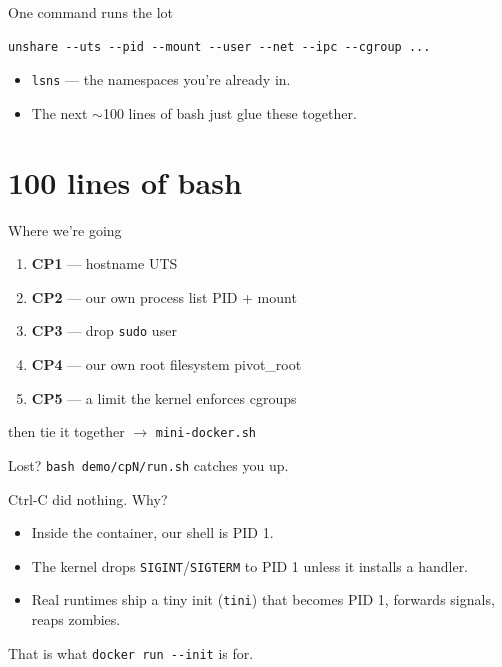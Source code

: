 \documentclass[10pt,aspectratio=169]{beamer}
\newcommand{\cmd}[1]{\texttt{\small #1}}
\begin{document}
\begin{frame}[fragile]{One command runs the lot}
  \begin{lstlisting}
unshare --uts --pid --mount --user --net --ipc --cgroup ...
  \end{lstlisting}
  \begin{itemize}
    \item \cmd{lsns} — the namespaces you're already in.
    \item The next \alert{$\sim$100 lines of bash} just glue these together.
  \end{itemize}
\end{frame}

\section{100 lines of bash}

\begin{frame}{Where we're going}
  \begin{enumerate}
    \item \textbf{CP1} — hostname \hfill {\small UTS}
    \item \textbf{CP2} — our own process list \hfill {\small PID + mount}
    \item \textbf{CP3} — drop \cmd{sudo} \hfill {\small user}
    \item \textbf{CP4} — our own root filesystem \hfill {\small pivot\_root}
    \item \textbf{CP5} — a limit the kernel enforces \hfill {\small cgroups}
  \end{enumerate}
  \vspace{1em}
  \begin{center}
    \small then tie it together $\rightarrow$ \cmd{mini-docker.sh}
  \end{center}
  \vfill
  {\footnotesize Lost? \cmd{bash demo/cpN/run.sh} catches you up.}
\end{frame}

\begin{frame}{Ctrl-C did nothing. Why?}
  \begin{itemize}
    \item Inside the container, our shell is \alert{PID 1}.
    \item The kernel \alert{drops} \cmd{SIGINT}/\cmd{SIGTERM} to PID 1 unless it
          installs a handler.
    \item Real runtimes ship a tiny init (\cmd{tini}) that becomes PID 1,
          forwards signals, reaps zombies.
  \end{itemize}
  \vspace{1em}
  \begin{center}
    \Large That is what \alert{\texttt{docker run -{}-init}} is for.
  \end{center}
\end{frame}
\end{document}
